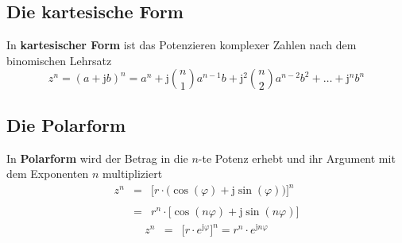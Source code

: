 \subsection{Die kartesische Form}
In \textbf{kartesischer Form} ist das Potenzieren komplexer Zahlen nach dem binomischen Lehrsatz  
\begin{equation}
\boxed{z^n=\left(a+\text{j}b\right)^n=a^n+\text{j}\displaystyle \binom{n}{1}a^{n-1}b+\text{j}^2\displaystyle\binom{n}{2}a^{n-2}b^2+\dotso+\text{j}^nb^n}
\end{equation}
\subsection{Die Polarform}
In \textbf{Polarform} wird der Betrag in die $n$-te Potenz erhebt und ihr Argument mit dem Exponenten $n$ multipliziert
\begin{equation} 
\boxed{
\begin{array}{lll}
z^n&=&\Big[r\cdot \Big(\cos\left(\varphi\right)+\text{j}\sin\left(\varphi\right)\Big)\Big]^n\\\\
&=&r^n\cdot \Big[\cos\left(n\varphi\right)+\text{j}\sin\left(n\varphi\right)\Big]
\end{array}
}
\end{equation} 
\begin{equation}
\boxed{
\begin{array}{lll}
z^n&=&\Big[r\cdot e^{\text{j}\varphi}\Big]^n=r^n\cdot e^{\text{j}n\varphi}
\end{array}
} 
\end{equation} 
